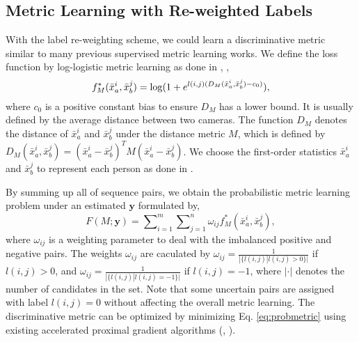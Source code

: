 \documentclass[10pt,twocolumn,letterpaper]{article}
\begin{document}
\subsection{Metric Learning with Re-weighted Labels}
With the label re-weighting scheme, we could learn a discriminative metric similar to many previous supervised metric learning works. We define the loss function by log-logistic metric learning as done in \cite{iccv15liao}, \ie,
\begin{equation}\label{eq:metric1}\small
 {f^*_M}(\bar{x}^{i}_{a},\bar{x}^{j}_{b}) = \log (1 + e^{l(i,j)(D_{M}(\bar{x}^{i}_{a},\bar{x}^{j}_{b})-c_0)}),
\end{equation}
where $c_0$ is a positive constant bias to ensure $D_M$ has a lower bound. It is usually defined by the average distance between two cameras. The function $D_{M}$ denotes the distance of $\bar{x}^{i}_{a}$ and $\bar{x}^{j}_{b}$ under the distance metric $M$, which is defined by $D_{M}(\bar{x}^{i}_{a},\bar{x}^{j}_{b}) = (\bar{x}^{i}_{a} - \bar{x}^{j}_{b})^{T}M(\bar{x}^{i}_{a} - \bar{x}^{j}_{b})$. We choose the first-order statistics $\bar{x}^{i}_{a}$ and $\bar{x}^{j}_{b}$ to represent each person as done in \cite{ijcai16video,cvpr16top}.

By summing up all of sequence pairs, we obtain the probabilistic metric learning problem under an estimated $\mathbf{y}$ formulated by,
\begin{equation}\label{eq:probmetric}
F(M;\mathbf{y}) = \sum \nolimits ^{m}_{i=1} \sum \nolimits ^{n}_{j=1} \omega _{ij} {f^*_M} (\bar{x}^{i}_{a},\bar{x}^{j}_{b}),
\end{equation}
where $\omega _{ij}$ is a weighting parameter to deal with the imbalanced positive and negative pairs. The weights $\omega _{ij}$ are caculated by $\omega _{ij} = \frac{1}{|\{l(i,j)|l(i,j)>0\}|}$ if $l(i,j)>0$, and $\omega _{ij} = \frac{1}{|\{l(i,j)|l(i,j)=-1\}|}$ if $l(i,j)=-1$, where $|\cdot|$ denotes the number of candidates in the set. Note that some uncertain pairs are assigned with label $l(i,j) = 0$ without affecting the overall metric learning. The discriminative metric can be optimized by minimizing Eq. \ref{eq:probmetric} using existing accelerated proximal gradient algorithms (\eg, \cite{apg09,iccv15liao,wang17Statistical}).
\end{document}
